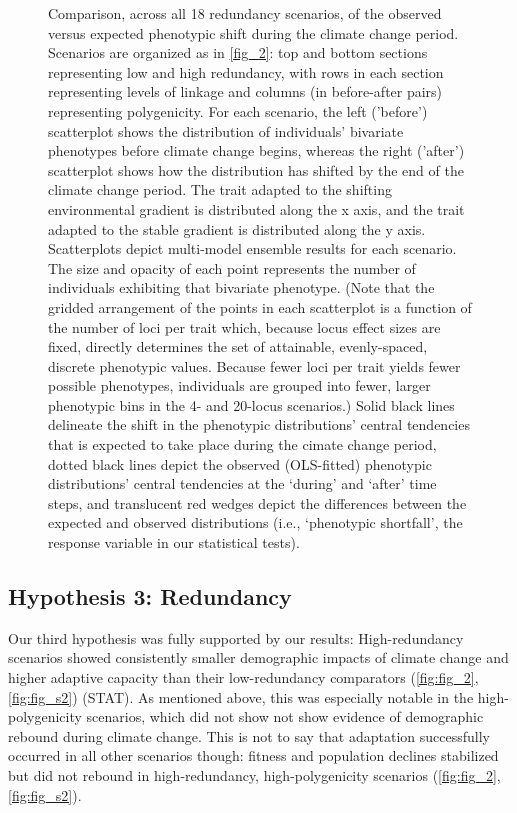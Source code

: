 \documentclass[9pt,twocolumn,twoside,lineno]{pnas-new}
\begin{document}
\begin{figure}
\caption{Comparison, across all 18 redundancy scenarios, of the observed versus expected phenotypic shift during the climate change period. Scenarios are organized as in \ref{fig_2}: top and bottom sections representing low and high redundancy, with rows in each section representing levels of linkage and columns (in before-after pairs) representing polygenicity. For each scenario, the left ('before') scatterplot shows the distribution of individuals’ bivariate phenotypes before climate change begins, whereas the right ('after') scatterplot shows how the distribution has shifted by the end of the climate change period. The trait adapted to the shifting environmental gradient is distributed along the x axis, and the trait adapted to the stable gradient is distributed along the y axis. Scatterplots depict multi-model ensemble results for each scenario. The size and opacity of each point represents the number of individuals exhibiting that bivariate phenotype. (Note that the gridded arrangement of the points in each scatterplot is a function of the number of loci per trait which, because locus effect sizes are fixed, directly determines the set of attainable, evenly-spaced, discrete phenotypic values. Because fewer loci per trait yields fewer possible phenotypes, individuals are grouped into fewer, larger phenotypic bins in the 4- and 20-locus scenarios.) Solid black lines delineate the shift in the phenotypic distributions’ central tendencies that is expected to take place during the cimate change period, dotted black lines depict the observed (OLS-fitted) phenotypic distributions’ central tendencies at the ‘during’ and ‘after’ time steps, and translucent red wedges depict the differences between the expected and observed distributions (i.e., ‘phenotypic shortfall’, the response variable in our statistical tests).
}
\label{fig:fig_4}
\end{figure}
 

\subsection{Hypothesis 3: Redundancy}
Our third hypothesis was fully supported by our results: High-redundancy scenarios showed
consistently smaller demographic impacts of climate change and higher adaptive capacity
than their low-redundancy comparators (\ref{fig:fig_2}, \ref{fig:fig_s2}) (STAT).
As mentioned above, this was especially notable in the high-polygenicity scenarios,
which did not show not show evidence of demographic rebound during climate change.
This is not to say that adaptation successfully occurred in all other scenarios though:
fitness and population declines stabilized but did not rebound
in high-redundancy, high-polygenicity scenarios (\ref{fig:fig_2}, \ref{fig:fig_s2}).
\end{document}
